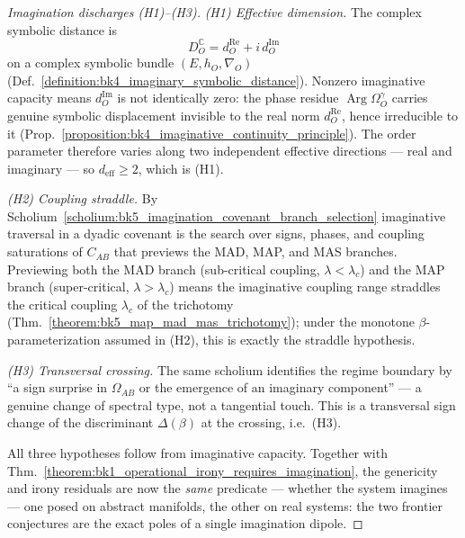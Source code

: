 \begin{proof}[Imagination discharges (H1)--(H3)]
\label{proof:bk1_imagination_supplies_effective_dimension}
\label{proof:bk1_imagination_supplies_genericity_hypotheses}
\leavevmode
\emph{(H1) Effective dimension.} The complex symbolic distance is
\[
D_O^{\mathbb{C}}=d_O^{\mathrm{Re}}+i\,d_O^{\mathrm{Im}}
\]
on a complex symbolic bundle $(E,h_O,\nabla_O)$
(Def.~\ref{definition:bk4_imaginary_symbolic_distance}). Nonzero imaginative capacity means $d_O^{\mathrm{Im}}$
is not identically zero: the phase residue $\operatorname{Arg}\Omega_O^\gamma$
carries genuine symbolic displacement invisible to the real norm
$d_O^{\mathrm{Re}}$, hence irreducible to it
(Prop.~\ref{proposition:bk4_imaginative_continuity_principle}). The order
parameter therefore varies along two independent effective directions --- real and
imaginary --- so $d_{\mathrm{eff}}\ge 2$, which is (H1).

\emph{(H2) Coupling straddle.} By
Scholium~\ref{scholium:bk5_imagination_covenant_branch_selection} imaginative
traversal in a dyadic covenant is the search over signs, phases, and coupling
saturations of $C_{AB}$ that previews the MAD, MAP, and MAS branches. Previewing
both the MAD branch (sub-critical coupling, $\lambda<\lambda_c$) and the MAP
branch (super-critical, $\lambda>\lambda_c$) means the imaginative coupling range
straddles the critical coupling $\lambda_c$ of the trichotomy
(Thm.~\ref{theorem:bk5_map_mad_mas_trichotomy}); under the monotone
$\beta$-parameterization assumed in (H2), this is exactly the straddle hypothesis.

\emph{(H3) Transversal crossing.} The same scholium identifies the regime
boundary by ``a sign surprise in $\Omega_{AB}$ or the emergence of an imaginary
component'' --- a genuine change of spectral type, not a tangential touch. This is
a transversal sign change of the discriminant $\Delta(\beta)$ at the crossing,
i.e.\ (H3).

All three hypotheses follow from imaginative capacity. Together with
Thm.~\ref{theorem:bk1_operational_irony_requires_imagination}, the genericity and
irony residuals are now the \emph{same} predicate --- whether the system
imagines --- one posed on abstract manifolds, the other on real systems: the two
frontier conjectures are the exact poles of a single imagination dipole.
\end{proof}

